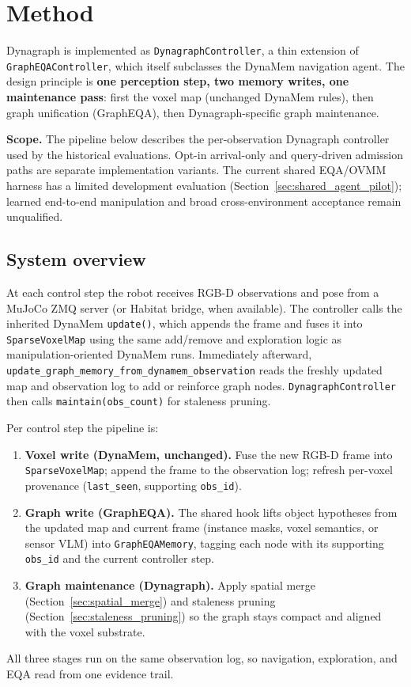 \section{Method}
\label{sec:method}

Dynagraph is implemented as \texttt{DynagraphController}, a thin extension of \texttt{GraphEQAController}, which itself subclasses the DynaMem navigation agent.
The design principle is \textbf{one perception step, two memory writes, one maintenance pass}: first the voxel map (unchanged DynaMem rules), then graph unification (GraphEQA), then Dynagraph-specific graph maintenance.

\noindent\textbf{Scope.} The pipeline below describes the per-observation Dynagraph controller used by the historical evaluations. Opt-in arrival-only and query-driven admission paths are separate implementation variants. The current shared EQA/OVMM harness has a limited development evaluation (Section~\ref{sec:shared_agent_pilot}); learned end-to-end manipulation and broad cross-environment acceptance remain unqualified.
\subsection{System overview}

At each control step the robot receives RGB-D observations and pose from a MuJoCo ZMQ server (or Habitat bridge, when available).
The controller calls the inherited DynaMem \texttt{update()}, which appends the frame and fuses it into \texttt{SparseVoxelMap} using the same add/remove and exploration logic as manipulation-oriented DynaMem runs.
Immediately afterward, \texttt{update\_graph\_memory\_from\_dynamem\_observation} reads the freshly updated map and observation log to add or reinforce graph nodes.
\texttt{DynagraphController} then calls \texttt{maintain(obs\_count)} for staleness pruning.

Per control step the pipeline is:
\begin{enumerate}
  \item \textbf{Voxel write (DynaMem, unchanged).} Fuse the new RGB-D frame into \texttt{SparseVoxelMap}; append the frame to the observation log; refresh per-voxel provenance (\texttt{last\_seen}, supporting \texttt{obs\_id}).
  \item \textbf{Graph write (GraphEQA).} The shared hook lifts object hypotheses from the updated map and current frame (instance masks, voxel semantics, or sensor VLM) into \texttt{GraphEQAMemory}, tagging each node with its supporting \texttt{obs\_id} and the current controller step.
  \item \textbf{Graph maintenance (Dynagraph).} Apply spatial merge (Section~\ref{sec:spatial_merge}) and staleness pruning (Section~\ref{sec:staleness_pruning}) so the graph stays compact and aligned with the voxel substrate.
\end{enumerate}
All three stages run on the same observation log, so navigation, exploration, and EQA read from one evidence trail.

